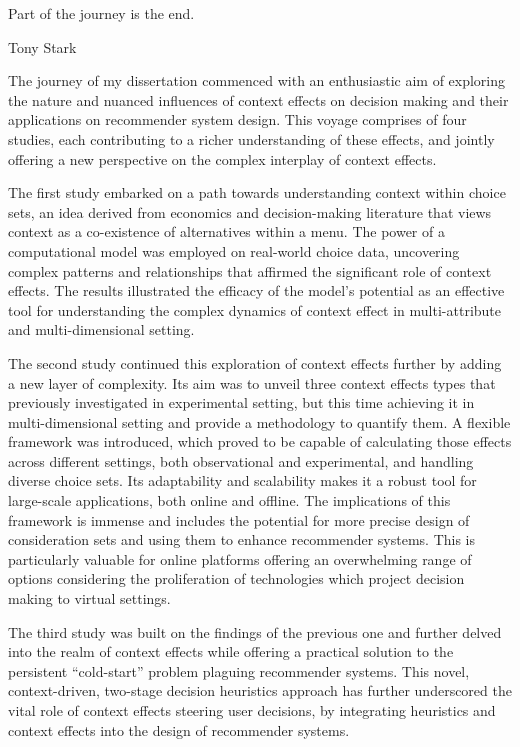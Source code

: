 \documentclass[a4paper,12pt]{article}
\begin{document}
\epigraph{Part of the journey is the end.}{Tony Stark}

The journey of my dissertation commenced with an enthusiastic aim of exploring the nature and nuanced influences of context effects on decision making and their applications on recommender system design. This voyage comprises of four studies, each contributing to a richer understanding of these effects, and jointly offering a new perspective on the complex interplay of context effects. 

The first study embarked on a path towards understanding context within choice sets, an idea derived from economics and decision-making literature that views context as a co-existence of alternatives within a menu. The power of a computational model was employed on real-world choice data, uncovering complex patterns and relationships that affirmed the significant role of context effects. The results illustrated the efficacy of the model's potential as an effective tool for understanding the complex dynamics of context effect in multi-attribute and multi-dimensional setting.

The second study continued this exploration of context effects further by adding a new layer of complexity. Its aim was to unveil three context effects types that previously investigated in experimental setting, but this time achieving it in multi-dimensional setting and provide a methodology to quantify them. A flexible framework was introduced, which proved to be capable of calculating those effects across different settings, both observational and experimental, and handling diverse choice sets. Its adaptability and scalability makes it a robust tool for large-scale applications, both online and offline. The implications of this framework is immense and includes the potential for more precise design of consideration sets and using them to enhance recommender systems. This is particularly valuable for online platforms offering an overwhelming range of options considering the proliferation of technologies which project decision making to virtual settings.

The third study was built on the findings of the previous one and further delved into the realm of context effects while offering a practical solution to the persistent ``cold-start'' problem plaguing  recommender systems. This novel, context-driven, two-stage decision heuristics approach has further underscored the vital role of context effects steering user decisions, by integrating heuristics and context effects into the design of recommender systems.
\end{document}
